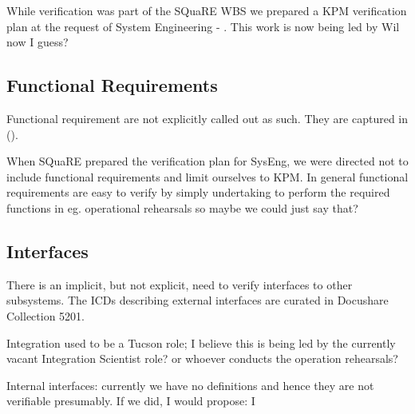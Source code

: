 \begin{note}
While verification was part of the SQuaRE WBS we prepared a KPM verification plan at the request of System Engineering - . This work is now being led by Wil now I guess?
\end{note}

\subsection{Functional Requirements}

Functional requirement are not explicitly called out as such. They are captured in  (\DMSR).

\begin{note}
When SQuaRE prepared the verification plan for SysEng, we were directed not to include functional requirements and limit ourselves to KPM. In general functional requirements are easy to verify by simply undertaking to perform the required functions in eg. operational rehearsals so maybe we could just say that?
\end{note}


\subsection{Interfaces}

There is an implicit, but not explicit, need to verify interfaces to other subsystems. The ICDs describing external interfaces are curated in Docushare Collection 5201.

\begin{note}
  Integration used to be a Tucson role; I believe this is being led by the currently vacant Integration Scientist role? or whoever conducts the operation rehearsals?
\end{note}

\begin{note}
  Internal interfaces: currently we have no definitions and hence they are not verifiable presumably. If we did, I would propose: I
\end{note}
